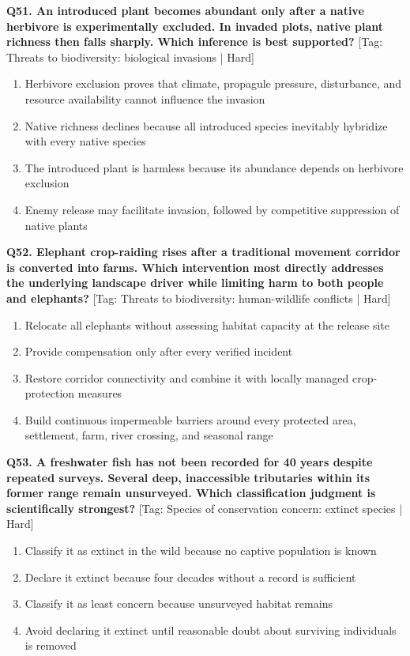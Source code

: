 \noindent\textbf{Q51. An introduced plant becomes abundant only after a native herbivore is experimentally excluded. In invaded plots, native plant richness then falls sharply. Which inference is best supported?} \hfill [Tag: Threats to biodiversity: biological invasions | Hard]
\begin{enumerate}[label=(\alph*),topsep=2pt,itemsep=1pt,partopsep=0pt,parsep=0pt]
    \item {Herbivore exclusion proves that climate, propagule pressure, disturbance, and resource availability cannot influence the invasion}
    \item {Native richness declines because all introduced species inevitably hybridize with every native species}
    \item {The introduced plant is harmless because its abundance depends on herbivore exclusion}
    \item {Enemy release may facilitate invasion, followed by competitive suppression of native plants}
\end{enumerate}
\vspace{2mm}

\noindent\textbf{Q52. Elephant crop-raiding rises after a traditional movement corridor is converted into farms. Which intervention most directly addresses the underlying landscape driver while limiting harm to both people and elephants?} \hfill [Tag: Threats to biodiversity: human-wildlife conflicts | Hard]
\begin{enumerate}[label=(\alph*),topsep=2pt,itemsep=1pt,partopsep=0pt,parsep=0pt]
    \item {Relocate all elephants without assessing habitat capacity at the release site}
    \item {Provide compensation only after every verified incident}
    \item {Restore corridor connectivity and combine it with locally managed crop-protection measures}
    \item {Build continuous impermeable barriers around every protected area, settlement, farm, river crossing, and seasonal range}
\end{enumerate}
\vspace{2mm}

\noindent\textbf{Q53. A freshwater fish has not been recorded for 40 years despite repeated surveys. Several deep, inaccessible tributaries within its former range remain unsurveyed. Which classification judgment is scientifically strongest?} \hfill [Tag: Species of conservation concern: extinct species | Hard]
\begin{enumerate}[label=(\alph*),topsep=2pt,itemsep=1pt,partopsep=0pt,parsep=0pt]
    \item {Classify it as extinct in the wild because no captive population is known}
    \item {Declare it extinct because four decades without a record is sufficient}
    \item {Classify it as least concern because unsurveyed habitat remains}
    \item {Avoid declaring it extinct until reasonable doubt about surviving individuals is removed}
\end{enumerate}
\vspace{2mm}

